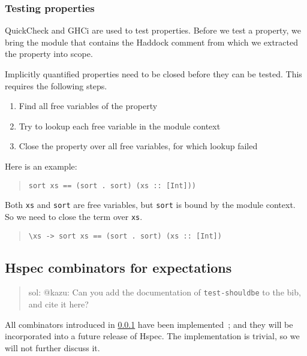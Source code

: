 \documentclass[preprint]{sigplanconf}
\begin{document}
\subsubsection{Testing properties}

\noindent QuickCheck and GHCi are used to test properties.  Before we
test a property, we bring the module that contains the Haddock comment
from which we extracted the property into scope.

Implicitly quantified properties need to be closed before they can be
tested.  This requires the following steps.
\begin{enumerate}
    \item
        Find all free variables of the property
    \item
        Try to lookup each free variable in the module context
    \item
        Close the property over all free variables, for which lookup
        failed
\end{enumerate}

\noindent Here is an example:

\begin{quote}\small\begin{verbatim}
sort xs == (sort . sort) (xs :: [Int]))
\end{verbatim}\end{quote}

\noindent Both \verb|xs| and \verb|sort| are free variables, but
\verb|sort| is bound by the module context.  So we need to close the
term over \verb|xs|.

\begin{quote}\small\begin{verbatim}
\xs -> sort xs == (sort . sort) (xs :: [Int])
\end{verbatim}\end{quote}


\subsection{Hspec combinators for expectations}
\label{sec:hspec-comb}

\begin{quote}
    sol: @kazu: Can you add the documentation of \verb|test-shouldbe|
    to the bib, and cite it here?
\end{quote}

\noindent All combinators introduced in \ref{} have been
implemented~\cite{todo}; and they will be incorporated into a future
release of Hspec.
The implementation is trivial, so we will not further discuss it.
\end{document}

